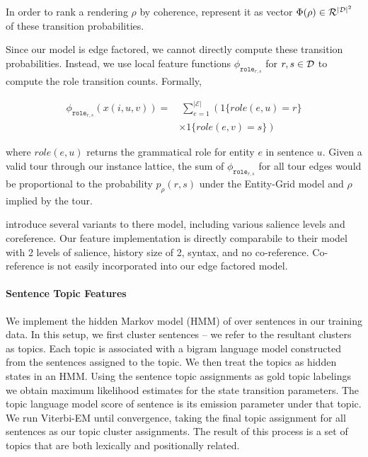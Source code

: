 \documentclass[11pt]{article}
\newcommand{\Roles}{{\cal D}}
\newcommand{\rend}{\rho}
\begin{document}
In order to rank a rendering $\rend$ by coherence, \cite{bandl} represent it as vector $\Phi(\rend) \in \mathcal{R}^{|\Roles|^2}$ of these transition probabilities.

Since our model is edge factored, we cannot directly compute these transition probabilities. Instead, we use local feature functions $\phi_{\texttt{role}_{r,s}}$ for $r,s \in \Roles$ to compute the role transition counts. Formally, 

\begin{align*}\phi_{\texttt{role}_{r,s}}(x (i, u, v)) =&\; \sum_{e=1}^{|\mathcal{E}|} \left( 1\{role(e,u) = r\} \right. \\
& \left. \times 1\{role(e, v) = s\} \right)
\end{align*}

where $role(e,u)$ returns the grammatical role for entity $e$ in sentence $u$.
Given a valid tour through our instance lattice, the sum of $\phi_{\texttt{role}_{r,s}}$ for all tour edges would be proportional to the probability $p_\rend(r,s)$ under the Entity-Grid model and $\rend$ implied by the tour.

\cite{bandl} introduce several variants to there model, including various salience levels and coreference. Our feature implementation is directly comparabile to their model with 2 levels of salience, history size of 2, syntax, and no co-reference. Co-reference is not easily incorporated into our edge factored model. 
 


\paragraph{Sentence Topic Features}

We implement the hidden Markov model (HMM) of  over sentences in our training data. 
In this setup, we first cluster sentences -- we refer to the resultant clusters as topics. 
Each topic is associated with a bigram language model constructed from the sentences assigned to the topic. 
We then treat the topics as hidden states in an HMM. 
Using the sentence topic assignments as gold topic labelings we obtain maximum likelihood estimates for the state transition parameters. 
The topic language model score of sentence is its emission parameter under that topic. We run Viterbi-EM until convergence, taking the final topic assignment for all sentences as our topic cluster assignments. 
The result of this process is a set of topics that are both lexically and positionally related. 
\end{document}

